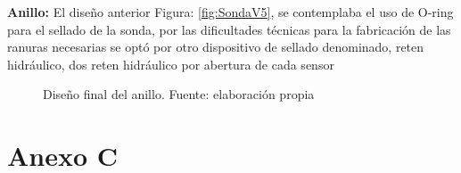 \begin{appendices}
\textbf{Anillo: }
El diseño anterior Figura: \ref{fig:SondaV5}, se contemplaba el uso de O-ring para el sellado de la sonda, por las dificultades t\'ecnicas para la fabricaci\'on de las ranuras necesarias se opt\'o por otro dispositivo de sellado denominado,  reten hidr\'aulico, dos reten hidr\'aulico por abertura de cada sensor
\\
\begin{figure}[ht]
\centering
{}
\caption{Dise\~no final del anillo. Fuente: elaboración propia}
\label{fig:Anillo2019}
\end{figure}

\chapter*{Anexo C}
\label{appendix: c}


\end{appendices}
